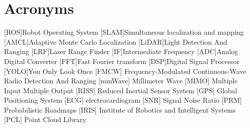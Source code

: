 \chapter*{Acronyms}
	\begin{acronym}[RELAX NG]
	[ROS]{Robot Operating System}
	[SLAM]{Simultaneous localization and mapping}
    [AMCL]{Adaptive Monte Carlo Localization}
    [LiDAR]{Light Detection And Ranging}
	[LRF]{Laser Range Finder}
	[IF]{Intermediate Frequency}
	[ADC]{Analog Digital Converter}
	[FFT]{Fast Fourier transform}
    [DSP]{Digital Signal Processor}
	[YOLO]{You Only Look Once}
	 [FMCW] {Frequency-Modulated Continuous-Wave}
	 {Radio Detection And Ranging}
	[mmWave] {Millimeter Wave}
	[MIMO] {Multiple Input Multiple Output}
	[RISS] {Reduced Inertial Sensor System}
	[GPS] {Global Positioning System}
	[ECG] {electrocardiogram}
	[SNR] {Signal Noise Ratio}
	[PRM] {Probabilistic Roadmaps}
	[IRIS] {Institute of Robotics and Intelligent Systems}
	[PCL] {Point Cloud Library}
	\end{acronym}